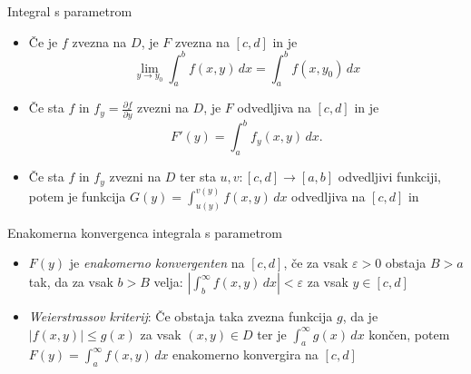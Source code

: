 \documentclass[a4paper,10pt]{article}
\begin{document}
\begin{multicols}{2}
\begin{formulaBox}{Integral s parametrom}
	\begin{itemize}
			\item  Če je $f$ zvezna na $D$, je $F$ zvezna na $[c,d]$ in je 
			\[ \lim_{y\to y_0} \int_a^b f(x,y)\,dx = \int_a^b f(x,y_0)\,dx
			\]
			\item  Če sta $f$ in $f_y = \frac{\partial f}{\partial y}$ zvezni na $D$, je $F$  odvedljiva na $[c,d]$ in je 
			\[  F'(y)= \int_a^b f_y(x,y)\,dx.
			\]
			\item  Če sta $f$ in $f_y$ zvezni na  $D$ ter sta  $u, v : [c,d] \to [a,b]$   odvedljivi funkciji, potem je funkcija 
			$G(y) =  \int_{u(y)}^{v(y)} f(x,y)\,dx$
			odvedljiva na $[c,d]$ in
			\begin{comment}
			\item  $\displaystyle F(y)$ %
	    	je \emph{enakomerno konvergenten} na $[c,d]$, če za vsak $\varepsilon >0$ obstaja $B>a$ tak, da za vsak  $b>B$ velja: $\displaystyle \left| \int_b^\infty f(x,y)\,dx \right| < \varepsilon$ za vsak $y\in[c,d]$
	  		\item \emph{(Weierstrassov kriterij)} Če obstaja taka zvezna funkcija $g$, da je  $\left| f(x,y)\right| \le g(x)$ za vsak  $(x,y) \in D$ ter je  $\displaystyle \int_a^\infty g(x)\,dx$ končen, potem  $\displaystyle F(y) = \int_a^\infty f(x,y)\,dx$ enakomerno konvergira na $[c,d]$
	  		\end{comment}
	\end{itemize}
\end{formulaBox}

\begin{formulaBox}{Enakomerna konvergenca integrala s parametrom}
	\begin{itemize}
		\item  $\displaystyle F(y)$ %
	    	je \emph{enakomerno konvergenten} na $[c,d]$, če za vsak $\varepsilon >0$ obstaja $B>a$ tak, da za vsak  $b>B$ velja: $\displaystyle \left| \int_b^\infty f(x,y)\,dx \right| < \varepsilon$ za vsak $y\in[c,d]$
	  	\item \emph{Weierstrassov kriterij}: Če obstaja taka zvezna funkcija $g$, da je  $\left| f(x,y)\right| \le g(x)$ za vsak  $(x,y) \in D$ ter je  $\displaystyle \int_a^\infty g(x)\,dx$ končen, potem  $\displaystyle F(y) = \int_a^\infty f(x,y)\,dx$ enakomerno konvergira na $[c,d]$
	\end{itemize}
\end{formulaBox}


\end{multicols}
\end{document}
